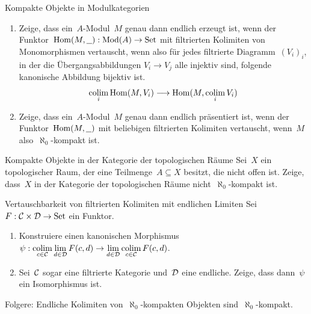 \documentclass{uebblatt}
\begin{document}

\begin{aufgabe}{Kompakte Objekte in Modulkategorien}
\begin{enumerate}
\item Zeige, dass ein~$A$-Modul~$M$ genau dann endlich erzeugt ist, wenn der
Funktor~$\mathrm{Hom}(M,\underline{\ \ }) : \mathrm{Mod}(A) \to \mathrm{Set}$ mit filtrierten
Kolimiten von Monomorphismen vertauscht, wenn also für jedes filtrierte
Diagramm~$(V_i)_i$, in der die Übergangsabbildungen $V_i \to V_j$ alle injektiv
sind, folgende kanonische Abbildung bijektiv ist.
\[ \operatorname*{colim}_i \mathrm{Hom}(M,V_i) \longrightarrow \mathrm{Hom}(M, \operatorname*{colim}_i V_i) \]
\vspace{-1.7em}
\item Zeige, dass ein~$A$-Modul~$M$ genau dann endlich präsentiert ist, wenn
der Funktor~$\mathrm{Hom}(M,\underline{\ \ })$ mit beliebigen filtrierten Kolimiten
vertauscht, wenn~$M$ also~$\aleph_0$-kompakt ist.
\end{enumerate}
\end{aufgabe}

\begin{aufgabe}{Kompakte Objekte in der Kategorie der topologischen Räume}
Sei~$X$ ein topologischer Raum, der eine Teilmenge~$A \subseteq X$ besitzt, die
nicht offen ist. Zeige, dass~$X$ in der Kategorie der topologischen Räume
nicht~$\aleph_0$-kompakt ist.
\end{aufgabe}

\begin{aufgabe}{Vertauschbarkeit von filtrierten Kolimiten mit endlichen Limiten}
Sei~$F : \mathcal{C} \times \mathcal{D} \to \mathrm{Set}$ ein Funktor.
\begin{enumerate}
\item Konstruiere einen kanonischen Morphismus~$\psi : \operatorname*{colim}\limits_{c \in \mathcal{C}}
\lim\limits_{d \in \mathcal{D}} F(c,d) \to \lim\limits_{d \in \mathcal{D}} \operatorname*{colim}\limits_{c \in \mathcal{C}} F(c,d)$.
\item Sei~$\mathcal{C}$ sogar eine filtrierte Kategorie und~$\mathcal{D}$ eine endliche. Zeige, dass dann~$\psi$ ein Isomorphismus ist.
\end{enumerate}
Folgere: Endliche Kolimiten von~$\aleph_0$-kompakten Objekten
sind~$\aleph_0$-kompakt.
\end{aufgabe}
\end{document}
